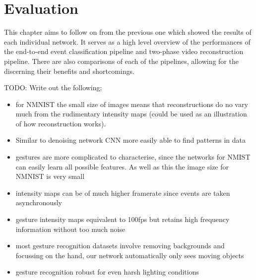 \chapter{Evaluation} \label{chap:evaluation}

This chapter aims to follow on from the previous one which showed the results of each individual network. It serves as a high level overview of the performances of the end-to-end event classification pipeline and two-phase video reconstruction pipeline. There are also comparisons of each of the pipelines, allowing for the discerning their benefits and shortcomings.

\color{red} TODO: Write out the following;

\begin{itemize}
    \item for NMNIST the small size of images means that reconstructions do no vary much from the rudimentary intensity maps (could be used as an illustration of how reconstruction works).
    \item Similar to denoising network CNN more easily able to find patterns in data
    \item gestures are more complicated to characterise, since the networks for NMIST can easily learn all possible features. As well as this the image size for NMNIST is very small
    \item intensity maps can be of much higher framerate since events are taken asynchronously
    \item gesture intensity maps equivalent to 100fps but retains high frequency information without too much noise
    \item most gesture recognition datasets involve removing backgrounds and focussing on the hand, our network automatically only sees moving objects
    \item gesture recognition robust for even harsh lighting conditions
\end{itemize}

\color{black}